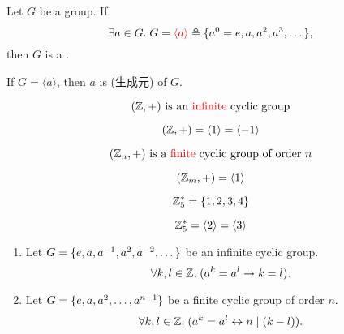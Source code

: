\begin{frame}
  \begin{definition}
    Let $G$ be a group. If
    \[
      \exists a \in G.\; G = \textcolor{red}{\langle a \rangle}
        \triangleq \{a^{0} = e, a, a^{2}, a^{3}, \dots\},
    \]
    then $G$ is a .
  \end{definition}

  \pause
  \vspace{0.50cm}
  \begin{center}
    If $G = \langle a \rangle$, then $a$ is   (生成元) of $G$.
  \end{center}
\end{frame}

\begin{frame}
  \[
    (\mathbb{Z}, +) \text{ is an \textcolor{red}{infinite} cyclic group}
  \]

  \pause
  \[
    (\mathbb{Z}, +) = \langle 1 \rangle = \langle -1 \rangle
  \]

  \pause
  \vspace{0.50cm}
  \[
    (\mathbb{Z}_{n}, +) \text{ is a \textcolor{red}{finite} cyclic group of order } n
  \]

  \pause
  \[
    (\mathbb{Z}_{m}, +) = \langle 1 \rangle
  \]
\end{frame}

\begin{frame}
  \[
    \mathbb{Z}^{\ast}_{5} = \{1, 2, 3, 4\}
  \]

  \pause
  \[
    \mathbb{Z}^{\ast}_{5} = \langle 2 \rangle = \langle 3 \rangle
  \]
\end{frame}

\begin{frame}{}
  \begin{theorem}
    \begin{enumerate}[<+->][(1)]
      \setlength{\itemsep}{6pt}
      \item Let $G = \{e, a, a^{-1}, a^2, a^{-2}, \dots\}$
        be an infinite cyclic group.
        \[
          \forall k, l \in \mathbb{Z}.\; (a^k = a^l \to k = l).
        \]
      \item Let $G = \{e, a, a^2, \dots, a^{n-1}\}$
        be a finite cyclic group of order $n$.
        \[
          \forall k, l \in \mathbb{Z}.\; (a^{k} = a^{l} \leftrightarrow n \mid (k-l)).
        \]
    \end{enumerate}
  \end{theorem}
\end{frame}

